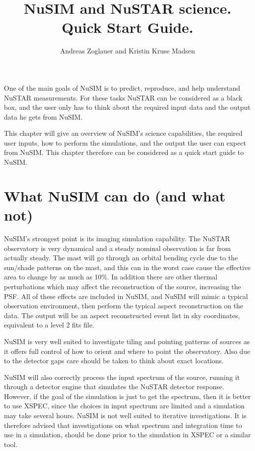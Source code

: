 \documentclass[11pt]{article}
\begin{document}
\title{NuSIM and NuSTAR science. Quick Start Guide.}
\author{Andreas Zoglauer and Kristin Kruse Madsen}
\maketitle
One of the main goals of NuSIM is to predict, reproduce, and help understand NuSTAR measurements.
For these tasks NuSTAR can be considered as a black box, and the user only has to think about the required input data and the output data he gets from NuSIM. 

This chapter will give an overview of NuSIM's science capabilities, the required user inputs, how to perform the simulations, and the output the user can expect from NuSIM. This chapter therefore can be considered as a quick start guide to NuSIM.

\section{What NuSIM can do (and what not)}

NuSIM's strongest point is its imaging simulation capability. The NuSTAR observatory is very dynamical and a steady nominal observation is far from actually steady. The mast will go through an orbital bending cycle due to the sun/shade patterns on the mast, and this can in the worst case cause the effective area to change  by as much as 10\%. In addition there are other thermal perturbations which may affect the reconstruction of the source, increasing the PSF. All of these effects are included in NuSIM, and NuSIM will mimic a typical observation environment, then perform the typical aspect reconstruction on the data. The output will be an aspect reconstructed event list in sky coordinates, equivalent to a level 2 fits file.

NuSIM is very well suited to investigate tiling and pointing patterns of sources as it offers full control of how to orient and where to point the observatory. Also due to the detector gaps care should be taken to think about exact locations.

NuSIM will also correctly process the input spectrum of the source, running it through a detector engine that simulates the NuSTAR detector response. However, if the goal of the simulation is just to get the spectrum, then it is better to use XSPEC, since the choices in input spectrum are limited and a simulation may take several hours. NuSIM is not well suited to iterative investigations. It is therefore advised that investigations on what spectrum and integration time to use in a simulation, should be done prior to the simulation in XSPEC or a similar tool.
\end{document}

